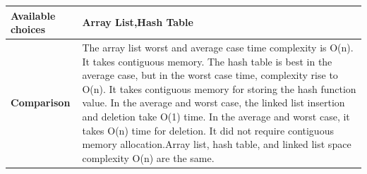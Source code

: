 \documentclass[12pt,a4paper]{report}
\begin{document}
\begin{center}
\begin{tabular}{ | m{4cm}|m{12cm}| }
 \\ \hline
\textbf{Available choices}& Array List,Hash Table \\ \hline
\textbf{Comparison}&
The array list worst and average case time complexity is O(n). It takes contiguous memory. The hash table is best in the average case, but in the worst case time, complexity rise to O(n). It takes contiguous memory for storing the hash function value. In the average and worst case, the linked list insertion and deletion take O(1) time. In the average and worst case, it takes O(n) time for deletion. It did not require contiguous memory allocation.Array list, hash table, and linked list space complexity O(n) are the same.
 \\ \hline
\end{tabular}
\end{center}
\end{document}
